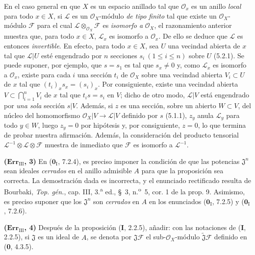 En el caso general en que $X$ es un espacio anillado tal que $\mathscr O_x$ es
un anillo \emph{local} para
todo $x\in X$, si $\mathscr L$ es un $\mathscr O_X$-módulo \emph{de tipo finito}
tal que existe un $\mathscr O_X$-módulo $\mathscr F$ para el cual
$\mathscr L\otimes_{\mathscr O_X}\mathscr F$ es \emph{isomorfo a}
$\mathscr O_X$, el razonamiento anterior muestra que, para todo $x\in X$,
$\mathscr L_x$ es isomorfo a $\mathscr O_x$. De ello se deduce que $\mathscr L$
es entonces \emph{invertible}. En efecto, para todo $x\in X$, sea $U$ una
vecindad abierta de $x$ tal que $\mathscr L|U$ esté engendrado por $n$ secciones
$s_i\ (1\leq i\leq n)$ sobre $U$ (5.2.1). Se puede suponer, por ejemplo, que
$s=s_1$ es tal que $s_x\ne0$ y, como $\mathscr L_x$ es isomorfo a
$\mathscr O_x$, existe para cada $i$ una sección $t_i$ de $\mathscr O_X$ sobre
una vecindad abierta $V_i\subset U$ de $x$ tal que
$(t_i)_x s_x=(s_i)_x$. Por consiguiente, existe una vecindad abierta
$V\subset\bigcap_{i=1}^nV_i$ de $x$ tal que $t_i s=s_i$ en $V$; dicho de otro
modo, $\mathscr L|V$ está engendrado por \emph{una sola} sección $s|V$. Además,
si $z$ es una sección, sobre un abierto $W\subset V$, del núcleo del
homomorfismo $\mathscr O_X|V\to\mathscr L|V$ definido por $s$ (5.1.1), $z_y$
anula $\mathscr L_y$ para todo $y\in W$, luego $z_y=0$ por hipótesis y, por
consiguiente, $z=0$, lo que termina de probar nuestra afirmación. Además, la
consideración del producto tensorial
$\mathscr L^{-1}\otimes\mathscr L\otimes\mathscr F$ muestra de inmediato que
$\mathscr F$ es isomorfo a $\mathscr L^{-1}$.

\noindent\textbf{($\mathbf{Err}_{\mathrm{III}}$, 3)} En
($\mathbf{0}_{\mathrm I}$, 7.2.4), es preciso imponer la condición de que las potencias
$\mathfrak J^n$ sean ideales \emph{cerrados} en el anillo admisible $A$ para
que la proposición sea correcta. La demostración dada es incorrecta, y el
enunciado rectificado resulta de Bourbaki, \emph{Top. gén.}, cap. III,
3.\textsuperscript{a} ed., \S~3, n.\textsuperscript{o}~5, cor. 1 de la prop. 9.
Asimismo, es preciso suponer que los $\mathfrak J^n$ son \emph{cerrados} en $A$
en los enunciados ($\mathbf{0}_{\mathrm I}$, 7.2.5) y ($\mathbf{0}_{\mathrm I}$, 7.2.6).

\noindent\textbf{($\mathbf{Err}_{\mathrm{III}}$, 4)} Después de la
proposición (\textbf I, 2.2.5), añadir: con las notaciones de (\textbf I, 2.2.5), si
$\mathfrak J$ es un ideal de $A$, se denota por
$\mathfrak J\mathscr F$ el sub-$\mathscr O_X$-módulo
$\widetilde{\mathfrak J}\mathscr F$ definido en (\textbf{0}, 4.3.5).

